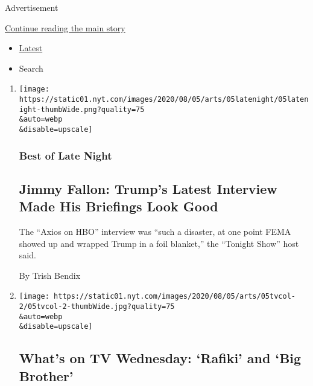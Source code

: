 Advertisement

\protect\hyperlink{after-mid1}{Continue reading the main story}

\begin{itemize}
\tightlist
\item
  \protect\hyperlink{stream-panel}{Latest}
\item
  Search
\end{itemize}

\begin{enumerate}
\def\labelenumi{\arabic{enumi}.}
\item
  \href{/2020/08/05/arts/television/jimmy-fallon-trumps-latest-interview-made-his-briefings-look-good.html}{}

  \texttt{[image: https://static01.nyt.com/images/2020/08/05/arts/05latenight/05latenight-thumbWide.png?quality=75\\\&auto=webp\\\&disable=upscale]}

  \hypertarget{best-of-late-night}{%
  \subsubsection{Best of Late Night}\label{best-of-late-night}}

  \hypertarget{jimmy-fallon-trumps-latest-interview-made-his-briefings-look-good}{%
  \subsection{Jimmy Fallon: Trump's Latest Interview Made His Briefings
  Look
  Good}\label{jimmy-fallon-trumps-latest-interview-made-his-briefings-look-good}}

  The ``Axios on HBO'' interview was ``such a disaster, at one point
  FEMA showed up and wrapped Trump in a foil blanket,'' the ``Tonight
  Show'' host said.

  By Trish Bendix
\item
  \href{/2020/08/05/arts/television/whats-on-tv-wednesday-rafiki-and-big-brother.html}{}

  \texttt{[image: https://static01.nyt.com/images/2020/08/05/arts/05tvcol-2/05tvcol-2-thumbWide.jpg?quality=75\\\&auto=webp\\\&disable=upscale]}

  \hypertarget{whats-on-tv-wednesday-rafiki-and-big-brother}{%
  \subsection{What's on TV Wednesday: `Rafiki' and `Big
  Brother'}\label{whats-on-tv-wednesday-rafiki-and-big-brother}}


\end{enumerate}
